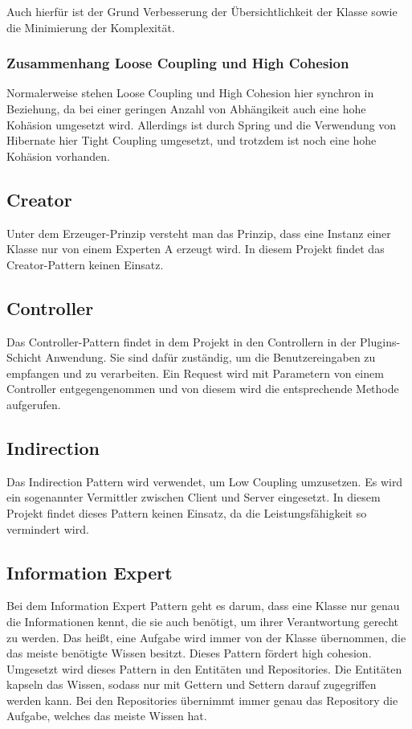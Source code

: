 		Auch hierfür ist der Grund Verbesserung der Übersichtlichkeit der Klasse sowie die Minimierung der Komplexität.
		
		\subsubsection{Zusammenhang Loose Coupling und High Cohesion}
		Normalerweise stehen Loose Coupling und High Cohesion  hier synchron in Beziehung, da bei einer geringen Anzahl von Abhängikeit auch eine hohe Kohäsion umgesetzt wird. Allerdings ist durch Spring und die Verwendung von Hibernate hier Tight Coupling umgesetzt, und trotzdem ist noch eine hohe Kohäsion vorhanden.

    \subsection{Creator}
    Unter dem Erzeuger-Prinzip versteht man das Prinzip, dass eine Instanz einer Klasse nur von einem Experten A erzeugt wird. In diesem Projekt findet das Creator-Pattern keinen Einsatz. 
    
    \subsection{Controller}
    Das Controller-Pattern findet in dem Projekt in den Controllern in der Plugins-Schicht Anwendung. Sie sind dafür zuständig, um die Benutzereingaben zu empfangen und zu verarbeiten. Ein Request wird mit Parametern von einem Controller entgegengenommen und von diesem wird die entsprechende Methode aufgerufen.
    
    \subsection{Indirection}
    Das Indirection Pattern wird verwendet, um Low Coupling umzusetzen. Es wird ein sogenannter Vermittler zwischen Client und Server eingesetzt. In diesem Projekt findet dieses Pattern keinen Einsatz, da die Leistungsfähigkeit so vermindert wird.
    
    \subsection{Information Expert}
    Bei dem Information Expert Pattern geht es darum, dass eine Klasse nur genau die Informationen kennt, die sie auch benötigt, um ihrer Verantwortung gerecht zu werden. Das heißt, eine Aufgabe wird immer von der Klasse übernommen, die das meiste benötigte Wissen besitzt. Dieses Pattern fördert high cohesion. Umgesetzt wird dieses Pattern in den Entitäten und Repositories. Die Entitäten kapseln das Wissen, sodass nur mit Gettern und Settern darauf zugegriffen werden kann. Bei den Repositories übernimmt immer genau das Repository die Aufgabe, welches das meiste Wissen hat.
    
